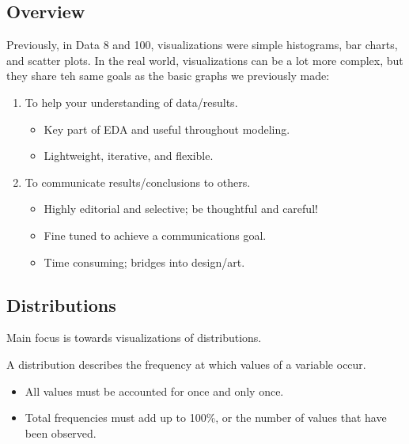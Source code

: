 
\subsection{Overview}
Previously, in Data 8 and 100, visualizations were simple histograms, bar charts, and scatter plots. In the real world, visualizations can be a lot more complex, but they share teh same goals as the basic graphs we previously made:
\begin{enumerate}
\item To help your understanding of data/results.
\begin{itemize}
\item Key part of EDA and useful throughout modeling.
\item Lightweight, iterative, and flexible.
\end{itemize}
\item To communicate results/conclusions to others.
\begin{itemize}
\item Highly editorial and selective; be thoughtful and careful!
\item Fine tuned to achieve a communications goal.
\item Time consuming; bridges into design/art.
\end{itemize}
\end{enumerate}

\subsection{Distributions}
Main focus is towards visualizations of distributions.
\begin{definition}[Distribution]{A distribution describes the frequency at which values of a variable occur.
\begin{itemize}
\item All values must be accounted for once and only once.
\item Total frequencies must add up to 100\%, or the number of values that have been observed.
\end{itemize}
}
\end{definition}

